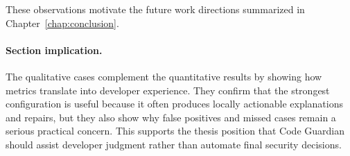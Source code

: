 These observations motivate the future work directions summarized in Chapter~\ref{chap:conclusion}.

\paragraph{Section implication.}
The qualitative cases complement the quantitative results by showing how metrics translate into developer experience. They confirm that the strongest configuration is useful because it often produces locally actionable explanations and repairs, but they also show why false positives and missed cases remain a serious practical concern. This supports the thesis position that Code Guardian should assist developer judgment rather than automate final security decisions.
